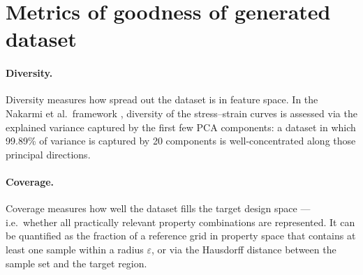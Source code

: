 \documentclass{article}
\begin{document}


\section{Metrics of goodness of generated dataset}

\paragraph{Diversity.}
Diversity measures how spread out the dataset is in feature space.  
In the Nakarmi et al.\ framework \cite{nakarmi2024}, diversity of the
stress--strain curves is assessed via the explained variance captured by
the first few PCA components: a dataset in which 99.89\% of variance is
captured by 20 components is well-concentrated along those principal
directions.

\paragraph{Coverage.}
Coverage measures how well the dataset fills the target design space — i.e.\
whether all practically relevant property combinations are represented.  It can
be quantified as the fraction of a reference grid in property space that
contains at least one sample within a radius $\varepsilon$, or via the
Hausdorff distance between the sample set and the target region.
\end{document}
